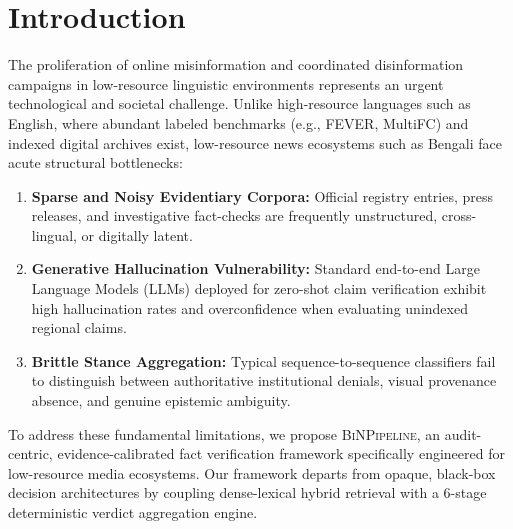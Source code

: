 
\section{Introduction}
\label{sec:intro}

The proliferation of online misinformation and coordinated disinformation campaigns in low-resource linguistic environments represents an urgent technological and societal challenge. Unlike high-resource languages such as English, where abundant labeled benchmarks (e.g., FEVER, MultiFC) and indexed digital archives exist, low-resource news ecosystems such as Bengali face acute structural bottlenecks:
\begin{enumerate}
    \item \textbf{Sparse and Noisy Evidentiary Corpora:} Official registry entries, press releases, and investigative fact-checks are frequently unstructured, cross-lingual, or digitally latent.
    \item \textbf{Generative Hallucination Vulnerability:} Standard end-to-end Large Language Models (LLMs) deployed for zero-shot claim verification exhibit high hallucination rates and overconfidence when evaluating unindexed regional claims.
    \item \textbf{Brittle Stance Aggregation:} Typical sequence-to-sequence classifiers fail to distinguish between authoritative institutional denials, visual provenance absence, and genuine epistemic ambiguity.
\end{enumerate}

To address these fundamental limitations, we propose \textsc{BiNPipeline}, an audit-centric, evidence-calibrated fact verification framework specifically engineered for low-resource media ecosystems. Our framework departs from opaque, black-box decision architectures by coupling dense-lexical hybrid retrieval with a 6-stage deterministic verdict aggregation engine. 

